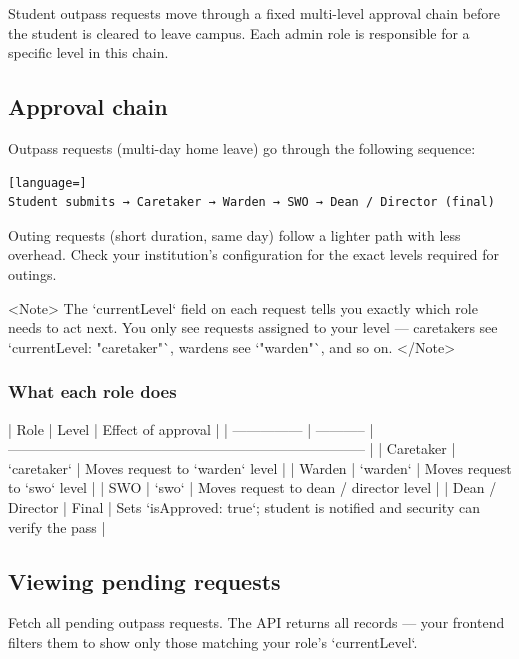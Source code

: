 


Student outpass requests move through a fixed multi-level approval chain before the student is cleared to leave campus. Each admin role is responsible for a specific level in this chain.

\subsection{Approval chain}

Outpass requests (multi-day home leave) go through the following sequence:

\begin{lstlisting}[language=]
Student submits → Caretaker → Warden → SWO → Dean / Director (final)

\end{lstlisting}

Outing requests (short duration, same day) follow a lighter path with less overhead. Check your institution's configuration for the exact levels required for outings.

<Note>
  The `currentLevel` field on each request tells you exactly which role needs to
  act next. You only see requests assigned to your level — caretakers see
  `currentLevel: "caretaker"`, wardens see `"warden"`, and so on.
</Note>

\subsubsection{What each role does}

| Role            | Level       | Effect of approval                                                            |
| --------------- | ----------- | ----------------------------------------------------------------------------- |
| Caretaker       | `caretaker` | Moves request to `warden` level                                               |
| Warden          | `warden`    | Moves request to `swo` level                                                  |
| SWO             | `swo`       | Moves request to dean / director level                                        |
| Dean / Director | Final       | Sets `isApproved: true`; student is notified and security can verify the pass |

\subsection{Viewing pending requests}

Fetch all pending outpass requests. The API returns all records — your frontend filters them to show only those matching your role's `currentLevel`.

